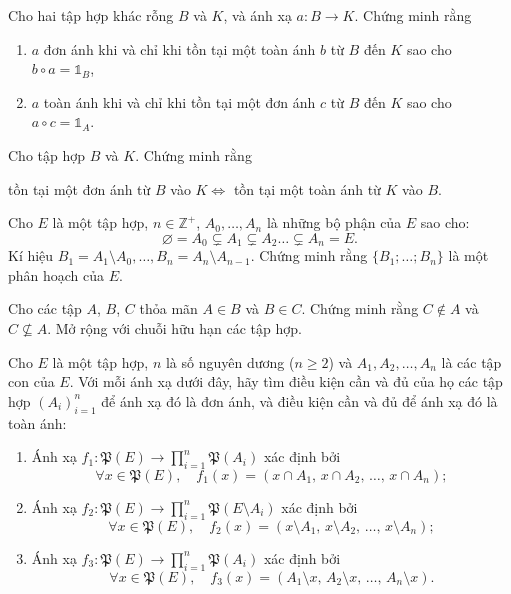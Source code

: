 
\exercise Cho hai tập hợp khác rỗng $B$ và $K$, và ánh xạ $a: B \to K$. Chứng minh rằng
\begin{enumerate}
   \item $a$ đơn ánh khi và chỉ khi tồn tại một toàn ánh $b$ từ $B$ đến $K$ sao cho $b \circ a = \mathds{1}_B$,
   \item $a$ toàn ánh khi và chỉ khi tồn tại một đơn ánh $c$ từ $B$ đến $K$ sao cho $a \circ c = \mathds{1}_A$.
\end{enumerate}

\exercise Cho tập hợp $B$ và $K$. Chứng minh rằng
\begin{center}
   tồn tại một đơn ánh từ $B$ vào $K \iff $ tồn tại một toàn ánh từ $K$ vào $B$. 
\end{center}

\exercise Cho $E$ là một tập hợp, $n \in \mathbb{Z}^+$, $A_0, \dots, A_n$ là những bộ phận của $E$ sao cho:
\[
    \varnothing = A_0 \subsetneq A_1 \subsetneq A_2 \dots \subsetneq A_n = E.
\]
Kí hiệu $B_1 = A_1 \setminus A_0, \dots, B_n = A_n \setminus A_{n-1}$. Chứng minh rằng $\{B_1; \dots; B_n\}$ là một phân hoạch của $E$.

\exercise Cho các tập $A$, $B$, $C$ thỏa mãn $A \in B$ và $B \in C$. Chứng minh rằng $C \notin A$ và $C \nsubseteq A$. Mở rộng với chuỗi hữu hạn các tập hợp.

\exercise Cho $E$ là một tập hợp, $n$ là số nguyên dương ($n \ge 2$) và $A_1, A_2, \dots, A_n$ là các tập con của $E$. Với mỗi ánh xạ dưới đây, hãy tìm điều kiện cần và đủ của họ các tập hợp $(A_i)_{i=1}^n$ để ánh xạ đó là đơn ánh, và điều kiện cần và đủ để ánh xạ đó là toàn ánh:
\begin{enumerate}
   \item Ánh xạ $f_1 : \mathfrak{P}(E) \to \prod_{i=1}^n \mathfrak{P}(A_i)$ xác định bởi
   \begin{equation*}
      \forall x \in \mathfrak{P}(E), \quad f_1(x) = (x \cap A_1,\, x \cap A_2,\, \dots,\, x \cap A_n);
   \end{equation*}

   \item Ánh xạ $f_2 : \mathfrak{P}(E) \to \prod_{i=1}^n \mathfrak{P}(E \setminus A_i)$ xác định bởi
   \begin{equation*}
      \forall x \in \mathfrak{P}(E), \quad f_2(x) = (x \setminus A_1,\, x \setminus A_2,\, \dots,\, x \setminus A_n);
   \end{equation*}

   \item Ánh xạ $f_3 : \mathfrak{P}(E) \to \prod_{i=1}^n \mathfrak{P}(A_i)$ xác định bởi
   \begin{equation*}
      \forall x \in \mathfrak{P}(E), \quad f_3(x) = (A_1 \setminus x,\, A_2 \setminus x,\, \dots,\, A_n \setminus x).
   \end{equation*}
\end{enumerate}

